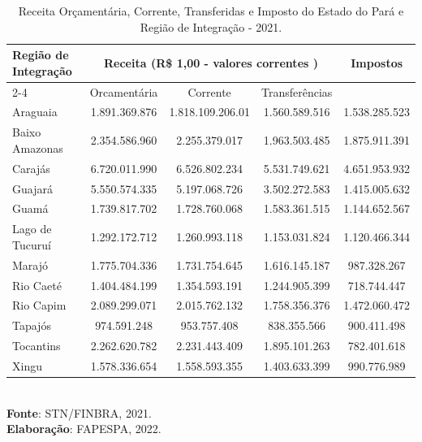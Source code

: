 \begin{table}[!htb]
\centering
    {
    \caption{Receita Orçamentária, Corrente, Transferidas e Imposto do Estado do Pará e Região de Integração - 2021.}
    \label{obitos2}
    \vspace{0.1cm}
\begin{tabular}{l|c|c|c|c}
\hline\hline 
\multirow{2}{*}{Região de Integração} & \multicolumn{3}{c|}{Receita (R\$ 1,00 - valores correntes )}                                                     & \multirow{2}{*}{Impostos} \\ \cline{2-4}
                           & \multicolumn{1}{c|}{Orcamentária} & \multicolumn{1}{c|}{Corrente} & Transferências &  \\ 
\hline\hline                           
Araguaia           &  1.891.369.876 & 1.818.109.206.01 & 1.560.589.516 & 1.538.285.523 \\
Baixo Amazonas     &  2.354.586.960 & 2.255.379.017    & 1.963.503.485 & 1.875.911.391 \\
Carajás            &  6.720.011.990 & 6.526.802.234    & 5.531.749.621 & 4.651.953.932 \\
Guajará            &  5.550.574.335 & 5.197.068.726    & 3.502.272.583 & 1.415.005.632 \\
Guamá              &  1.739.817.702 & 1.728.760.068    & 1.583.361.515 & 1.144.652.567 \\
Lago de Tucuruí    &  1.292.172.712 & 1.260.993.118    & 1.153.031.824 & 1.120.466.344 \\
Marajó             &  1.775.704.336 & 1.731.754.645    & 1.616.145.187 & 987.328.267   \\
Rio Caeté          &  1.404.484.199 & 1.354.593.191    & 1.244.905.399 &  718.744.447  \\
Rio Capim          &  2.089.299.071 & 2.015.762.132    & 1.758.356.376 &  1.472.060.472 \\
Tapajós            &  974.591.248   & 953.757.408      & 838.355.566   &  900.411.498  \\
Tocantins          &  2.262.620.782 & 2.231.443.409    & 1.895.101.263 &  782.401.618 \\
Xingu              &  1.578.336.654 & 1.558.593.355    & 1.403.633.399 &  990.776.989 \\                   
\hline\hline
\end{tabular}}
\\ 
\hspace{-8.4cm}
\textbf{Fonte}: STN/FINBRA, 2021. \\
\hspace{-8.2cm}
\textbf{Elaboração}: FAPESPA, 2022.
\end{table}


